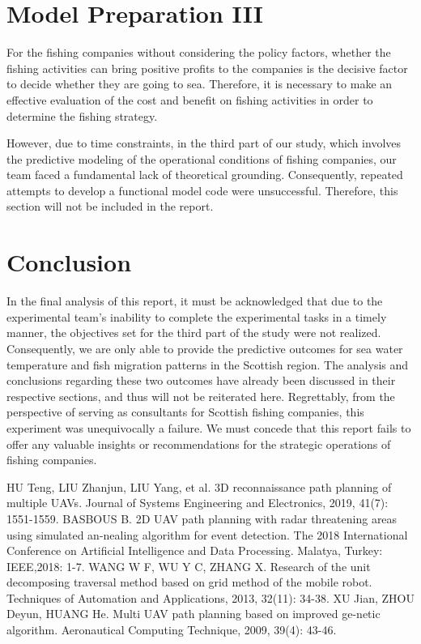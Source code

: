\documentclass[12pt]{article}  %
\begin{document}
\section{Model Preparation III}
For the fishing companies without considering the policy factors, whether the fishing
activities can bring positive profits to the companies is the decisive factor to decide whether
they are going to sea. Therefore, it is necessary to make an effective evaluation of the cost
and benefit on fishing activities in order to determine the fishing strategy.

However, due to time constraints, in the third part of our study, which involves the predictive modeling of the operational conditions of fishing companies, our team faced a fundamental lack of theoretical grounding. Consequently, repeated attempts to develop a functional model code were unsuccessful. Therefore, this section will not be included in the report.

\section{Conclusion}
In the final analysis of this report, it must be acknowledged that due to the experimental team's inability to complete the experimental tasks in a timely manner, the objectives set for the third part of the study were not realized. Consequently, we are only able to provide the predictive outcomes for sea water temperature and fish migration patterns in the Scottish region. The analysis and conclusions regarding these two outcomes have already been discussed in their respective sections, and thus will not be reiterated here. Regrettably, from the perspective of serving as consultants for Scottish fishing companies, this experiment was unequivocally a failure. We must concede that this report fails to offer any valuable insights or recommendations for the strategic operations of fishing companies.


\clearpage   %
\begin{thebibliography}{99}
	 HU Teng, LIU Zhanjun, LIU Yang, et al. 3D reconnaissance path planning of multiple UAVs. Journal of Systems Engineering and Electronics, 2019, 41(7): 1551-1559.
	 BASBOUS B. 2D UAV path planning with radar threatening areas using simulated an-nealing algorithm for event detection. The 2018 International Conference on Artificial Intelligence and Data Processing. Malatya, Turkey: IEEE,2018: 1-7.
	 WANG W F, WU Y C, ZHANG X. Research of the unit decomposing traversal method based on grid method of the mobile robot. Techniques of Automation and Applications, 2013, 32(11): 34-38.
	 XU Jian, ZHOU Deyun, HUANG He. Multi UAV path planning based on improved ge-netic algorithm. Aeronautical Computing Technique, 2009, 39(4): 43-46.

\end{thebibliography}
%  
\end{document}
